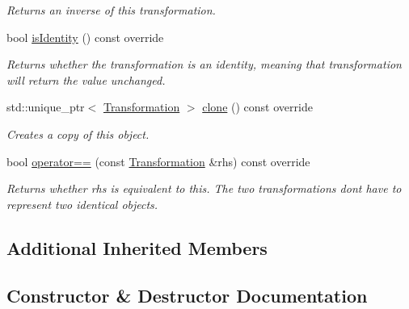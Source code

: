 \begin{DoxyCompactItemize}
\begin{DoxyCompactList}\small\item\em Returns an inverse of this transformation. \end{DoxyCompactList}\item 
bool \hyperlink{classdg_1_1deepcore_1_1geometry_1_1_geo_transformation_a2e861b4541aa6f9b208c05b229feb665}{is\+Identity} () const override
\begin{DoxyCompactList}\small\item\em Returns whether the transformation is an identity, meaning that transformation will return the value unchanged. \end{DoxyCompactList}\item 
std\+::unique\+\_\+ptr$<$ \hyperlink{structdg_1_1deepcore_1_1geometry_1_1_transformation}{Transformation} $>$ \hyperlink{classdg_1_1deepcore_1_1geometry_1_1_geo_transformation_a448c15e383231e33963e489817085b24}{clone} () const override
\begin{DoxyCompactList}\small\item\em Creates a copy of this object. \end{DoxyCompactList}\item 
bool \hyperlink{classdg_1_1deepcore_1_1geometry_1_1_geo_transformation_af49413c6749681ada8be2f4f77091263}{operator==} (const \hyperlink{structdg_1_1deepcore_1_1geometry_1_1_transformation}{Transformation} \&rhs) const override
\begin{DoxyCompactList}\small\item\em Returns whether {\ttfamily rhs} is equivalent to this. The two transformations don\textquotesingle{}t have to represent two identical objects. \end{DoxyCompactList}\end{DoxyCompactItemize}
\subsection*{Additional Inherited Members}


\subsection{Constructor \& Destructor Documentation}
